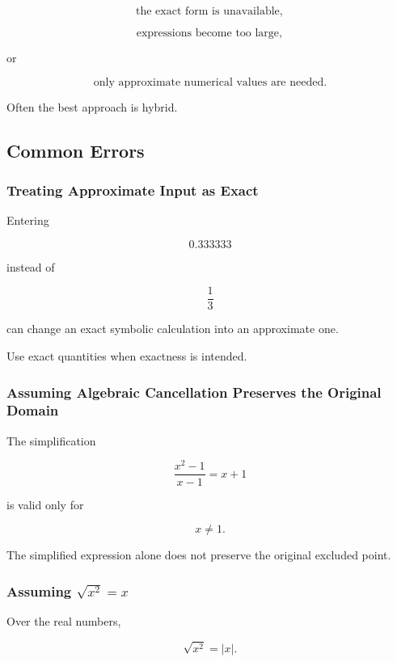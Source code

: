\[
\boxed{
\text{the exact form is unavailable},
}
\]

\[
\boxed{
\text{expressions become too large},
}
\]

or

\[
\boxed{
\text{only approximate numerical values are needed}.
}
\]

Often the best approach is hybrid.

\subsection{Common Errors}
\label{subsec:symbolic-computation-common-errors}

\subsubsection{Treating Approximate Input as Exact}

Entering

\[
0.333333
\]

instead of

\[
\frac13
\]

can change an exact symbolic calculation into an approximate one.

Use exact quantities when exactness is intended.

\subsubsection{Assuming Algebraic Cancellation Preserves the Original Domain}

The simplification

\[
\frac{x^2-1}{x-1}
=
x+1
\]

is valid only for

\[
x\neq1.
\]

The simplified expression alone does not preserve the original excluded
point.

\subsubsection{Assuming \(\sqrt{x^2}=x\)}

Over the real numbers,

\[
\boxed{
\sqrt{x^2}=|x|.
}
\]


